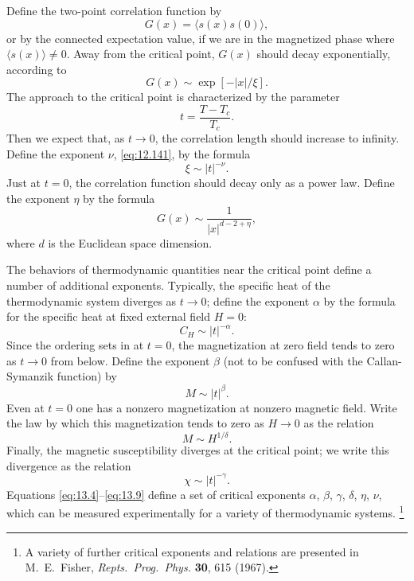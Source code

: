 Define the two-point correlation function by
\begin{equation}
  G(x) = \langle s(x)s(0)\rangle ,
  \label{eq:13.1}
\end{equation}
or by the connected expectation value, if we are in the magnetized phase where
$\langle s(x)\rangle \neq 0$.  Away from the critical point, $G(x)$ should
decay exponentially, according to
\begin{equation}
  G(x) \sim \exp[-|x|/\xi] .
  \label{eq:13.2}
\end{equation}
The approach to the critical point is characterized by the parameter
\begin{equation}
  t = \frac{T - T_c}{T_c} .
  \label{eq:13.3}
\end{equation}
Then we expect that, as $t\to 0$, the correlation length should increase to
infinity.  Define the exponent $\nu$, \eqref{eq:12.141}, by the formula
\begin{equation}
  \xi \sim |t|^{-\nu} .
  \label{eq:13.4}
\end{equation}
Just at $t = 0$, the correlation function should decay only as a power law.
Define the exponent $\eta$ by the formula
\begin{equation}
  G(x) \sim \frac{1}{|x|^{d-2+\eta}} ,
  \label{eq:13.5}
\end{equation}
where $d$ is the Euclidean space dimension.

The behaviors of thermodynamic quantities near the critical point define a
number of additional exponents.  Typically, the specific heat of the
thermodynamic system diverges as $t\to 0$; define the exponent $\alpha$ by the
formula for the specific heat at fixed external field $H = 0$:
\begin{equation}
  C_H \sim |t|^{-\alpha} .
  \label{eq:13.6}
\end{equation}
Since the ordering sets in at $t = 0$, the magnetization at zero field tends
to zero as $t\to 0$ from below.  Define the exponent $\beta$ (not to be
confused with the Callan-Symanzik function) by
\begin{equation}
  M \sim |t|^{\beta} .
  \label{eq:13.7}
\end{equation}
Even at $t = 0$ one has a nonzero magnetization at nonzero magnetic field.
Write the law by which this magnetization tends to zero as $H\to 0$ as the
relation
\begin{equation}
  M \sim H^{1/\delta} .
  \label{eq:13.8}
\end{equation}
Finally, the magnetic susceptibility diverges at the critical point; we write
this divergence as the relation
\begin{equation}
  \chi \sim |t|^{-\gamma} .
  \label{eq:13.9}
\end{equation}
Equations \eqref{eq:13.4}--\eqref{eq:13.9} define a set of critical exponents
$\alpha$, $\beta$, $\gamma$, $\delta$, $\eta$, $\nu$, which can be measured
experimentally for a variety of thermodynamic systems.%
\footnote{A variety of further critical exponents and relations are presented
in M.~E.~Fisher, \emph{Repts.\ Prog.\ Phys.} \textbf{30}, 615 (1967).}

